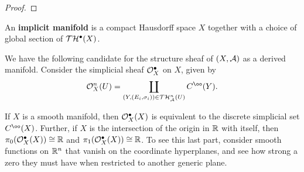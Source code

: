 \begin{proof}
\end{proof}

\begin{definition}\label{implicit-manifold}
An {\bf implicit manifold} is a compact Hausdorff space $X$ together with a choice of global section of $\mathcal T \mathcal H^\bullet(X)$. 
\end{definition}

We have the following candidate for the structure sheaf of $(X, \mathcal A)$ as a derived manifold. Consider the simplicial sheaf $\mathcal O_X^\bullet$ on $X$, given by
\[ \cO_X^n(U) = \coprod_{(Y, (E_i, \sigma_i)) \in \cT \cH_\cA^n(U)} C^\oo(Y). \]


\begin{speculation}
If $X$ is a smooth manifold, then $\mathcal O_X^\bullet(X)$ is equivalent to the discrete simplicial set $C^\oo(X)$. Further, if $X$ is the intersection of the origin in $\mathbb R$ with itself, then $\pi_0(\mathcal O_X^\bullet(X)) \cong \mathbb R$ and $\pi_1(\mathcal O_X^\bullet(X)) \cong \mathbb R$. To see this last part, consider smooth functions on $\mathbb R^n$ that vanish on the coordinate hyperplanes, and see how strong a zero they must have when restricted to another generic plane.
\end{speculation}